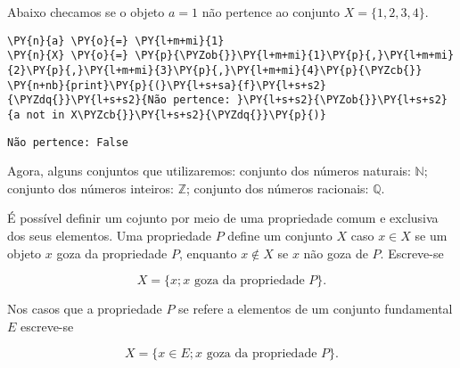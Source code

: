 \documentclass{book}
\begin{document}
        \begin{exemplo}
            Abaixo checamos se o objeto $a=1$ não pertence ao conjunto $X=\{1,2,3,4\}$.



\begin{Verbatim}[commandchars=\\\{\},frame=single,fontsize=\small, xleftmargin=0.5em]
\PY{n}{a} \PY{o}{=} \PY{l+m+mi}{1}
\PY{n}{X} \PY{o}{=} \PY{p}{\PYZob{}}\PY{l+m+mi}{1}\PY{p}{,}\PY{l+m+mi}{2}\PY{p}{,}\PY{l+m+mi}{3}\PY{p}{,}\PY{l+m+mi}{4}\PY{p}{\PYZcb{}}
\PY{n+nb}{print}\PY{p}{(}\PY{l+s+sa}{f}\PY{l+s+s2}{\PYZdq{}}\PY{l+s+s2}{Não pertence: }\PY{l+s+s2}{\PYZob{}}\PY{l+s+s2}{a not in X\PYZcb{}}\PY{l+s+s2}{\PYZdq{}}\PY{p}{)}
\end{Verbatim}

\begin{Verbatim}[commandchars=\\\{\},frame=leftline,fontsize=\small, xleftmargin=0.5em]
Não pertence: False
\end{Verbatim}

        \end{exemplo}

        Agora, alguns conjuntos que utilizaremos: conjunto dos números naturais: $\mathbb{N}$; conjunto dos números inteiros: $\mathbb{Z}$; conjunto dos números racionais: $\mathbb{Q}$.

        É possível definir um cojunto por meio de uma propriedade comum e exclusiva dos seus elementos. Uma propriedade $P$ define um conjunto $X$ caso $x \in X$ se um objeto $x$ goza da propriedade $P$, enquanto $x \notin X$ se $x$ não goza de $P$. Escreve-se

        $$ X = \{x; x \text{ goza da propriedade } P \} \text{.}$$
    
        Nos casos que a propriedade $P$ se refere a elementos de um conjunto fundamental $E$ escreve-se

        $$ X = \{x \in E; x \text{ goza da propriedade } P \} \text{.}$$
\end{document}
